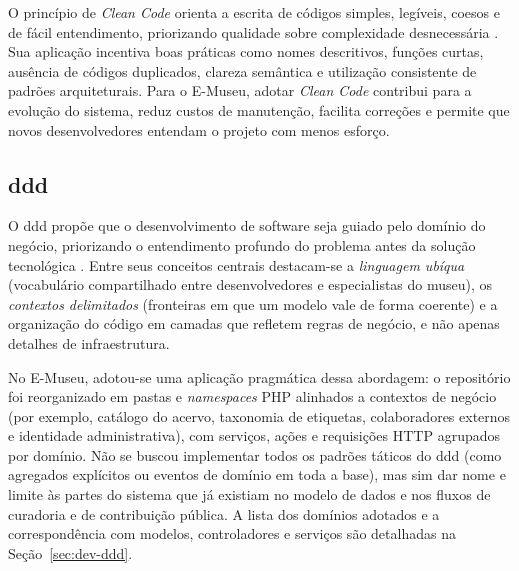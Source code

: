 O princípio de \textit{Clean Code} orienta a escrita de códigos simples, legíveis, coesos e de fácil entendimento, priorizando qualidade sobre complexidade desnecessária \cite{cleancode:2009}. Sua aplicação incentiva boas práticas como nomes descritivos, funções curtas, ausência de códigos duplicados, clareza semântica e utilização consistente de padrões arquiteturais. Para o E-Museu, adotar \textit{Clean Code} contribui para a evolução do sistema, reduz custos de manutenção, facilita correções e permite que novos desenvolvedores entendam o projeto com menos esforço.

\subsection{\acrfull{ddd}}\label{sec:ref-ddd}

O \acrfull{ddd} propõe que o desenvolvimento de software seja guiado pelo domínio do negócio, priorizando o entendimento profundo do problema antes da solução tecnológica \cite{ddd2004}. Entre seus conceitos centrais destacam-se a \textit{linguagem ubíqua} (vocabulário compartilhado entre desenvolvedores e especialistas do museu), os \textit{contextos delimitados} (fronteiras em que um modelo vale de forma coerente) e a organização do código em camadas que refletem regras de negócio, e não apenas detalhes de infraestrutura.

No E-Museu, adotou-se uma aplicação pragmática dessa abordagem: o repositório foi reorganizado em pastas e \textit{namespaces} PHP alinhados a contextos de negócio (por exemplo, catálogo do acervo, taxonomia de etiquetas, colaboradores externos e identidade administrativa), com serviços, ações e requisições HTTP agrupados por domínio. Não se buscou implementar todos os padrões táticos do \acrshort{ddd} (como agregados explícitos ou eventos de domínio em toda a base), mas sim dar nome e limite às partes do sistema que já existiam no modelo de dados e nos fluxos de curadoria e de contribuição pública. A lista dos domínios adotados e a correspondência com modelos, controladores e serviços são detalhadas na Seção~\ref{sec:dev-ddd}.


